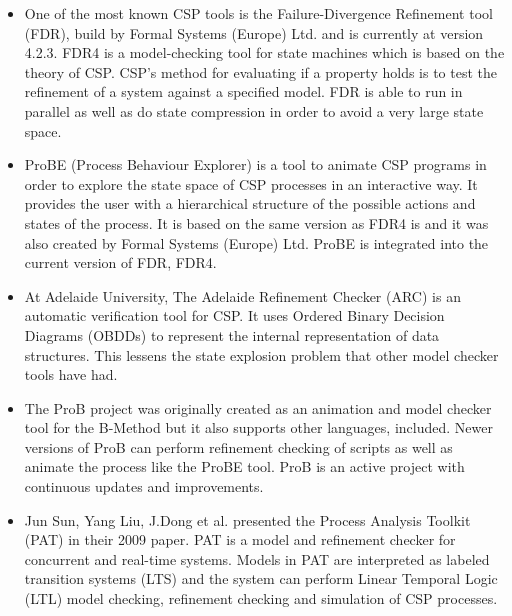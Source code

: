 \begin{itemize}
\item One of the most known CSP tools is the Failure-Divergence Refinement tool (FDR), build by Formal Systems (Europe) Ltd. and is currently at version 4.2.3\cite{fdr}. FDR4 is a model-checking tool for state machines which is based on the theory of CSP. CSP's method for evaluating if a property holds is to test the refinement of a system against a specified model.
FDR is able to run in parallel as well as do state compression in order to avoid a very large state space.
\item ProBE (Process Behaviour Explorer)\cite{probe} is a tool to animate CSP programs in order to explore the state space of CSP processes in an interactive way. It provides the user with a hierarchical structure of the possible actions and states of the process. It is based on the same \cspm{} version as FDR4 is and it was also created by Formal Systems (Europe) Ltd. ProBE is integrated into the current version of FDR, FDR4.
\item At Adelaide University, The Adelaide Refinement Checker (ARC)\cite{Parashkevov1996} is an automatic verification tool for CSP. It uses Ordered Binary Decision Diagrams (OBDDs) to represent the internal representation of data structures. This lessens the state explosion problem that other model checker tools have had.
\item The ProB project\cite{ProB}\cite{Leuschel2003} was originally created as an animation and model checker tool for the B-Method\cite{Abrial1988} but it also supports other languages, \cspm{}  included. Newer versions of ProB can perform refinement checking of \cspm{}  scripts as well as animate the process like the ProBE tool. ProB is an active project with continuous updates and improvements.
\item Jun Sun, Yang Liu, J.Dong et al. presented the Process Analysis Toolkit (PAT) in their 2009 paper\cite{Sun2009}. PAT is a model and refinement checker for concurrent and real-time systems. Models in PAT are interpreted as labeled transition systems (LTS) and the system can perform Linear Temporal Logic (LTL) model checking, refinement checking and simulation of CSP processes.
\end{itemize}

